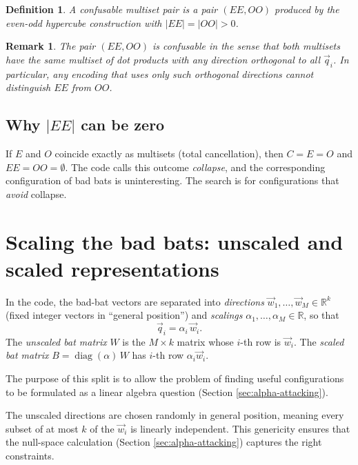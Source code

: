 \documentclass[12pt,a4paper]{article}
\newtheorem{definition}{Definition}
\newtheorem{remark}{Remark}
\begin{document}
\begin{definition}
  A \emph{confusable multiset pair} is a pair $(EE, OO)$ produced by the
  even-odd hypercube construction with $|EE| = |OO| > 0$.
\end{definition}

\begin{remark}
  The pair $(EE, OO)$ is confusable in the sense that both multisets have the
  same multiset of dot products with any direction orthogonal to all
  $\vec{q}_i$. In particular, any encoding that uses only such orthogonal
  directions cannot distinguish $EE$ from $OO$.
\end{remark}

\subsection*{Why $|EE|$ can be zero}

If $E$ and $O$ coincide exactly as multisets (total cancellation), then $C = E
= O$ and $EE = OO = \emptyset$. The code calls this outcome \emph{collapse},
and the corresponding configuration of bad bats is uninteresting. The search
is for configurations that \emph{avoid} collapse.

\section{Scaling the bad bats: unscaled and scaled representations}
\label{sec:scaling}

In the code, the bad-bat vectors are separated into \emph{directions}
$\vec{w}_1, \ldots, \vec{w}_M \in \mathbb{R}^k$ (fixed integer vectors in
``general position'') and \emph{scalings} $\alpha_1, \ldots, \alpha_M \in
\mathbb{R}$, so that
\[
  \vec{q}_i = \alpha_i \,\vec{w}_i.
\]
The \emph{unscaled bat matrix} $W$ is the $M \times k$ matrix whose $i$-th row
is $\vec{w}_i$. The \emph{scaled bat matrix} $B = \operatorname{diag}(\alpha)
\, W$ has $i$-th row $\alpha_i \vec{w}_i$.

The purpose of this split is to allow the problem of finding useful
configurations to be formulated as a linear algebra question (Section
\ref{sec:alpha-attacking}).

The unscaled directions are chosen randomly in general position, meaning every
subset of at most $k$ of the $\vec{w}_i$ is linearly independent. This
genericity ensures that the null-space calculation (Section
\ref{sec:alpha-attacking}) captures the right constraints.
\end{document}
